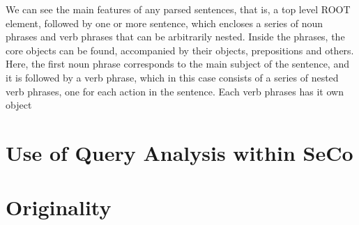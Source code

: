 We can see the main features of any parsed sentences, that is, a top level ROOT element, followed by one or more sentence, which encloses a series of noun phrases and verb phrases that can be arbitrarily nested. Inside the phrases, the core objects can be found, accompanied by their objects, prepositions and others. Here, the first noun phrase corresponds to the main subject of the sentence, and it is followed by a verb phrase, which in this case consists of a series of nested verb phrases, one for each action in the sentence. Each verb phrases has it own object



\section{Use of Query Analysis within SeCo} %
\label{sec:use_of_query_analysis_within_seco}


\section{Originality} %
\label{sec:originality}


